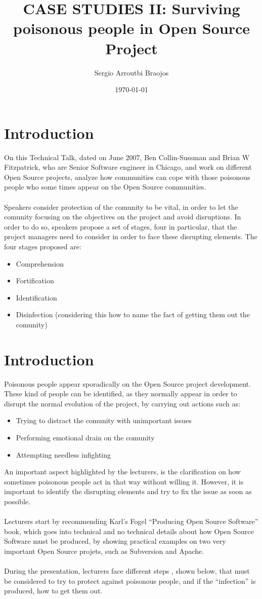 \documentclass[11pt]{article}
\title{\textbf{CASE STUDIES II: Surviving poisonous people in Open Source Project}}
\author{Sergio Arroutbi Braojos}
\date{\today}
\begin{document}
\maketitle

\section{Introduction}
On this Technical Talk, dated on June 2007, Ben Collin-Sussman and Brian W Fitzpatrick, who are Senior Software engineer in Chicago, and work on different Open Source projects, analyze how communities can cope with those poisonous people who some times appear on the Open Source communities.\\
\\
Speakers consider protection of the comunity to be vital, in order to let the comunity focusing on the objectives on the project and avoid disruptions.
In order to do so, speakers propose a set of stages, four in particular, that the project managers need to consider in order to face these disrupting elements. The four stages proposed are:
\begin{itemize}\itemsep0pt
\item{Comprehension}
\item{Fortification}
\item{Identification}
\item{Disinfection (considering this how to name the fact of getting them out the comunity)}
\end{itemize}

\section{Introduction}
Poisonous people appear sporadically on the Open Source project development. These kind of people can be identified, as they normally appear in order to disrupt the normal evolution of the project, by carrying out actions such as:
\begin{itemize}\itemsep0pt
\item{Trying to distract the comunity with unimportant issues}
\item{Performing emotional drain on the comunity}
\item{Attempting needless infighting}
\end{itemize}
An important aspect highlighted by the lecturers, is the clarification on how sometimes poisonous people act in that way without willing it. However, it is important to identify the disrupting elements and try to fix the issue as soon as possible.\\
\\
Lecturers start by recommending Karl's Fogel ``Producing Open Source Software'' book, which goes into technical and no technical details about how Open Source Software must be produced, by showing practical examples on two very important Open Source projets, such as Subversion and Apache.\\
\\
During the presentation, lecturers face different steps , shown below, that must be considered to try to protect against poisonous people, and if the ``infection'' is produced, how to get them out.\\
\end{document}
